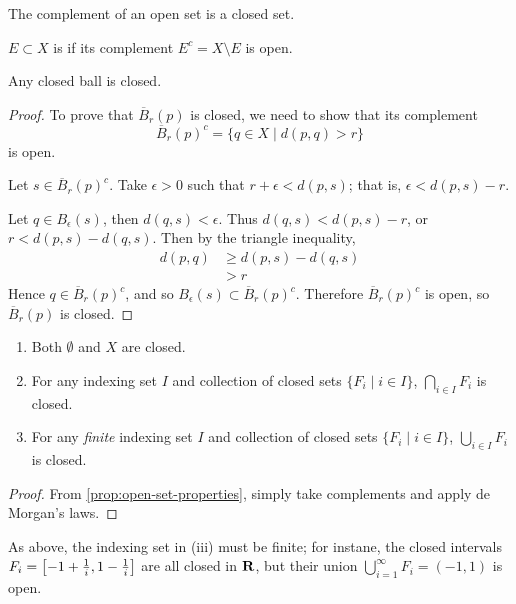 The complement of an open set is a closed set.

\begin{definition}
$E\subset X$ is  if its complement $E^c=X\setminus E$ is open.
\end{definition}

\begin{proposition}
Any closed ball is closed.
\end{proposition}

\begin{proof}
To prove that $\overline{B}_r(p)$ is closed, we need to show that its complement
\[\overline{B}_r(p)^c=\{q\in X\mid d(p,q)>r\}\]
is open.

Let $s\in\overline{B}_r(p)^c$. Take $\epsilon>0$ such that $r+\epsilon<d(p,s)$; that is, $\epsilon<d(p,s)-r$.

Let $q\in B_\epsilon(s)$, then $d(q,s)<\epsilon$. Thus $d(q,s)<d(p,s)-r$, or $r<d(p,s)-d(q,s)$. Then by the triangle inequality,
\begin{align*}
d(p,q)&\ge d(p,s)-d(q,s)\\
&>r
\end{align*}
Hence $q\in\overline{B}_r(p)^c$, and so $B_\epsilon(s)\subset\overline{B}_r(p)^c$. Therefore $\overline{B}_r(p)^c$ is open, so $\overline{B}_r(p)$ is closed.
\end{proof}

\begin{proposition}\label{prop:closed-set-properties}
\begin{enumerate}[label=(\roman*)]
\item Both $\emptyset$ and $X$ are closed.
\item For any indexing set $I$ and collection of closed sets $\{F_i\mid i\in I\}$, $\bigcap_{i\in I}F_i$ is closed.
\item For any \emph{finite} indexing set $I$ and collection of closed sets $\{F_i\mid i\in I\}$, $\bigcup_{i\in I}F_i$ is closed.
\end{enumerate}
\end{proposition}

\begin{proof}
From \cref{prop:open-set-properties}, simply take complements and apply de Morgan's laws.
\end{proof}

\begin{remark}
As above, the indexing set in (iii) must be finite; for instane, the closed intervals $F_i=\left[-1+\frac{1}{i},1-\frac{1}{i}\right]$ are all closed in $\mathbf R$, but their union $\bigcup_{i=1}^\infty F_i=(-1,1)$ is open.
\end{remark}

